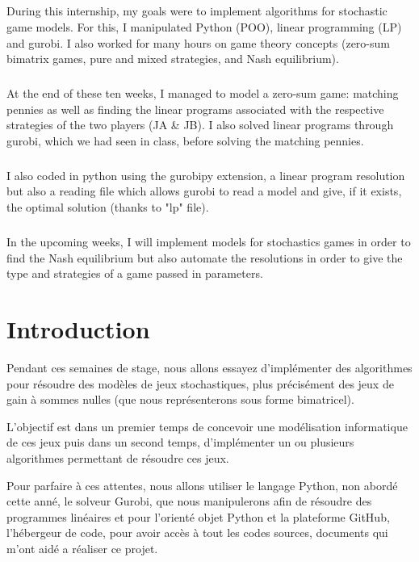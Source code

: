 \documentclass[a4paper, 12pt, twoside]{article}
\begin{document}
\vspace{2 cm}

\subparagraph*{}{During this internship, my goals were to implement algorithms for stochastic game models. For this, I manipulated \textsf{Python (POO)}, \textsf{linear programming (LP)} and \textsf{gurobi}. I also worked for many hours on game theory concepts (zero-sum bimatrix games, pure and mixed strategies, and Nash equilibrium).}

\subparagraph*{}{At the end of these ten weeks, I managed to model a zero-sum game: \textsf{matching pennies} as well as finding the linear programs associated with the respective strategies of the two players (JA \& JB). I also solved linear programs through \textsf{gurobi}, which we had seen in class, before solving the \textsf{matching pennies.}}

\subparagraph*{}{I also coded in python using the \textsf{gurobipy} extension, a linear program resolution but also a reading file which allows \textsf{gurobi} to read a model and give, if it exists, the optimal solution (thanks to "lp" file).}

\subparagraph*{}{In the upcoming weeks, I will implement models for \textsf{stochastics games} in order to find the \textsf{Nash equilibrium} but also automate the resolutions in order to give the type and strategies of a game passed in parameters.}
\newpage
\tableofcontents
\newpage

\section{Introduction}
Pendant ces semaines de stage, nous allons essayez d'implémenter des algorithmes pour résoudre des modèles de jeux stochastiques, plus précisément des jeux de gain à sommes nulles (que nous représenterons sous forme bimatricel). \newline

L'objectif est dans un premier temps de concevoir une modélisation informatique de ces jeux puis dans un second temps, d'implémenter un ou plusieurs algorithmes permettant de résoudre ces jeux.  \newline

Pour parfaire à ces attentes, nous allons utiliser le langage \textsf{Python}, non abordé cette anné, le solveur \textsf{Gurobi}, que nous manipulerons afin de résoudre des programmes linéaires et pour l'orienté objet \textsf{Python} et la plateforme \textsf{GitHub}, l'hébergeur de code, pour avoir accès à tout les codes sources, documents qui m'ont aidé a réaliser ce projet. \newline
\end{document}
